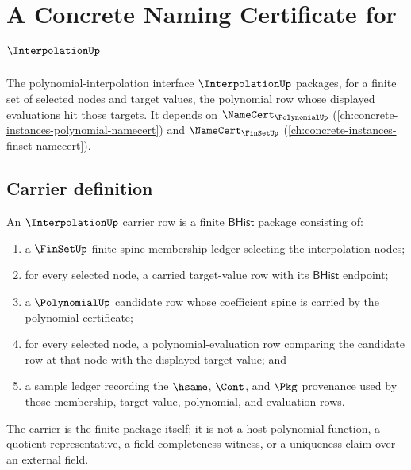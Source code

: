 \chapter{A Concrete Naming Certificate for $\InterpolationUp$}
\label{ch:concrete-instances-interpolation-namecert}

The polynomial-interpolation interface $\InterpolationUp$ packages, for a
finite set of selected nodes and target values, the polynomial row whose
displayed evaluations hit those targets. It depends on
$\NameCert_{\PolynomialUp}$ (\autoref{ch:concrete-instances-polynomial-namecert})
and $\NameCert_{\FinSetUp}$ (\autoref{ch:concrete-instances-finset-namecert}).

\section{Carrier definition}
\label{sec:interpolation-carrier}

\begin{definition}
\label{def:interpolation-bhist-node-carrier}
An $\InterpolationUp$ carrier row is a finite $\mathsf{BHist}$ package
consisting of:
\begin{enumerate}
\item a $\FinSetUp$ finite-spine membership ledger selecting the interpolation
nodes;
\item for every selected node, a carried target-value row with its
$\mathsf{BHist}$ endpoint;
\item a $\PolynomialUp$ candidate row whose coefficient spine is carried by
the polynomial certificate;
\item for every selected node, a polynomial-evaluation row comparing the
candidate row at that node with the displayed target value; and
\item a sample ledger recording the $\hsame$, $\Cont$, and $\Pkg$ provenance
used by those membership, target-value, polynomial, and evaluation rows.
\end{enumerate}
The carrier is the finite package itself; it is not a host polynomial function,
a quotient representative, a field-completeness witness, or a uniqueness claim
over an external field.
\end{definition}

